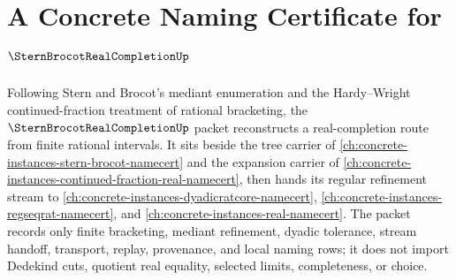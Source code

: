 \chapter{A Concrete Naming Certificate for $\SternBrocotRealCompletionUp$}
\label{ch:concrete-instances-stern-brocot-real-completion-namecert}

Following Stern and Brocot's mediant enumeration and the Hardy--Wright continued-fraction treatment of rational bracketing, the $\SternBrocotRealCompletionUp$ packet reconstructs a real-completion route from finite rational intervals. It sits beside the tree carrier of \autoref{ch:concrete-instances-stern-brocot-namecert} and the expansion carrier of \autoref{ch:concrete-instances-continued-fraction-real-namecert}, then hands its regular refinement stream to \autoref{ch:concrete-instances-dyadicratcore-namecert}, \autoref{ch:concrete-instances-regseqrat-namecert}, and \autoref{ch:concrete-instances-real-namecert}. The packet records only finite bracketing, mediant refinement, dyadic tolerance, stream handoff, transport, replay, provenance, and local naming rows; it does not import Dedekind cuts, quotient real equality, selected limits, completeness, or choice.

